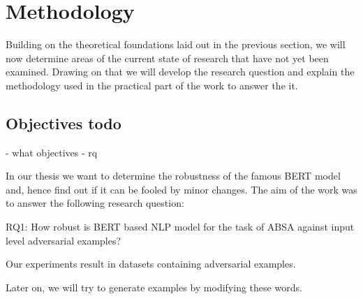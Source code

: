 \section{Methodology}
\label{sec:methodology}

Building on the theoretical foundations laid out in the previous section, we will now determine areas of the current state of research that have not yet been examined. Drawing on that we will develop the research question and explain the methodology used in the practical part of the work to answer the it. 



\subsection{Objectives todo}
\label{sec:objectives}
- what objectives
- rq

In our thesis we want to determine the robustness of the famous BERT model and, hence find out if it can be fooled by minor changes. The aim of the work was to answer the following research question:

RQ1: How robust is BERT based NLP model for the task of ABSA against input level adversarial examples?

Our experiments result in datasets containing adversarial examples.

Later on, we will try to generate examples by modifying these words.



